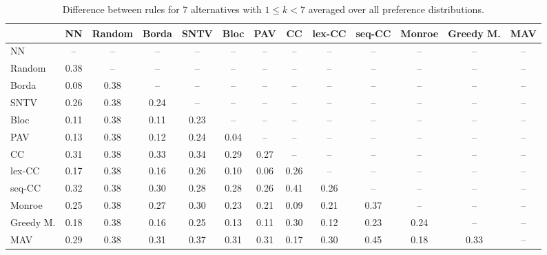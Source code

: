 
\begin{table*}[htbp]
\centering
\begin{tabular}{lcccccccccccc}
\toprule
 & NN & Random & Borda & SNTV & Bloc & PAV & CC & lex-CC & seq-CC & Monroe & Greedy M. & MAV \\
\midrule
NN & -- & -- & -- & -- & -- & -- & -- & -- & -- & -- & -- & -- \\
Random & \cellcolor{blue!38} 0.38 & -- & -- & -- & -- & -- & -- & -- & -- & -- & -- & -- \\
Borda & \cellcolor{blue!8} 0.08 & \cellcolor{blue!38} 0.38 & -- & -- & -- & -- & -- & -- & -- & -- & -- & -- \\
SNTV & \cellcolor{blue!26} 0.26 & \cellcolor{blue!38} 0.38 & \cellcolor{blue!24} 0.24 & -- & -- & -- & -- & -- & -- & -- & -- & -- \\
Bloc & \cellcolor{blue!11} 0.11 & \cellcolor{blue!38} 0.38 & \cellcolor{blue!11} 0.11 & \cellcolor{blue!23} 0.23 & -- & -- & -- & -- & -- & -- & -- & -- \\
PAV & \cellcolor{blue!13} 0.13 & \cellcolor{blue!38} 0.38 & \cellcolor{blue!12} 0.12 & \cellcolor{blue!24} 0.24 & \cellcolor{blue!4} 0.04 & -- & -- & -- & -- & -- & -- & -- \\
CC & \cellcolor{blue!31} 0.31 & \cellcolor{blue!38} 0.38 & \cellcolor{blue!33} 0.33 & \cellcolor{blue!34} 0.34 & \cellcolor{blue!28} 0.29 & \cellcolor{blue!27} 0.27 & -- & -- & -- & -- & -- & -- \\
lex-CC & \cellcolor{blue!17} 0.17 & \cellcolor{blue!38} 0.38 & \cellcolor{blue!16} 0.16 & \cellcolor{blue!26} 0.26 & \cellcolor{blue!10} 0.10 & \cellcolor{blue!6} 0.06 & \cellcolor{blue!26} 0.26 & -- & -- & -- & -- & -- \\
seq-CC & \cellcolor{blue!32} 0.32 & \cellcolor{blue!38} 0.38 & \cellcolor{blue!30} 0.30 & \cellcolor{blue!28} 0.28 & \cellcolor{blue!28} 0.28 & \cellcolor{blue!26} 0.26 & \cellcolor{blue!41} 0.41 & \cellcolor{blue!26} 0.26 & -- & -- & -- & -- \\
Monroe & \cellcolor{blue!25} 0.25 & \cellcolor{blue!38} 0.38 & \cellcolor{blue!27} 0.27 & \cellcolor{blue!30} 0.30 & \cellcolor{blue!23} 0.23 & \cellcolor{blue!21} 0.21 & \cellcolor{blue!9} 0.09 & \cellcolor{blue!21} 0.21 & \cellcolor{blue!37} 0.37 & -- & -- & -- \\
Greedy M. & \cellcolor{blue!18} 0.18 & \cellcolor{blue!38} 0.38 & \cellcolor{blue!16} 0.16 & \cellcolor{blue!25} 0.25 & \cellcolor{blue!13} 0.13 & \cellcolor{blue!11} 0.11 & \cellcolor{blue!30} 0.30 & \cellcolor{blue!12} 0.12 & \cellcolor{blue!23} 0.23 & \cellcolor{blue!24} 0.24 & -- & -- \\
MAV & \cellcolor{blue!28} 0.29 & \cellcolor{blue!38} 0.38 & \cellcolor{blue!31} 0.31 & \cellcolor{blue!37} 0.37 & \cellcolor{blue!31} 0.31 & \cellcolor{blue!31} 0.31 & \cellcolor{blue!17} 0.17 & \cellcolor{blue!30} 0.30 & \cellcolor{blue!45} 0.45 & \cellcolor{blue!18} 0.18 & \cellcolor{blue!33} 0.33 & -- \\
\bottomrule
\end{tabular}

\caption{Difference between rules for 7 alternatives with $1 \leq k < 7$ averaged over all preference distributions.}
\label{tab:rule_distance_heatmap-m=[7]-pref_dist=all}
\end{table*}
    